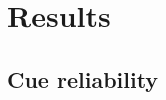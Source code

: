\documentclass{biorxiv}
\begin{document}
\section{Results}

\subsection{Cue reliability}


\end{document}
